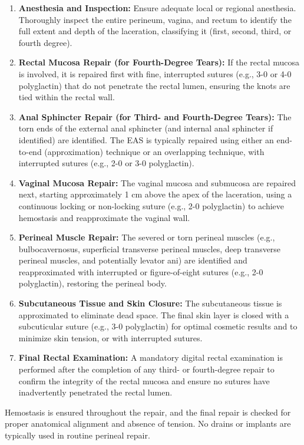 \begin{enumerate}
  \item \textbf{Anesthesia and Inspection:} Ensure adequate local or regional anesthesia. Thoroughly inspect the entire perineum, vagina, and rectum to identify the full extent and depth of the laceration, classifying it (first, second, third, or fourth degree).
  \item \textbf{Rectal Mucosa Repair (for Fourth-Degree Tears):} If the rectal mucosa is involved, it is repaired first with fine, interrupted sutures (e.g., 3-0 or 4-0 polyglactin) that do not penetrate the rectal lumen, ensuring the knots are tied within the rectal wall.
  \item \textbf{Anal Sphincter Repair (for Third- and Fourth-Degree Tears):} The torn ends of the external anal sphincter (and internal anal sphincter if identified) are identified. The EAS is typically repaired using either an end-to-end (approximation) technique or an overlapping technique, with interrupted sutures (e.g., 2-0 or 3-0 polyglactin).
  \item \textbf{Vaginal Mucosa Repair:} The vaginal mucosa and submucosa are repaired next, starting approximately 1 cm above the apex of the laceration, using a continuous locking or non-locking suture (e.g., 2-0 polyglactin) to achieve hemostasis and reapproximate the vaginal wall.
  \item \textbf{Perineal Muscle Repair:} The severed or torn perineal muscles (e.g., bulbocavernosus, superficial transverse perineal muscles, deep transverse perineal muscles, and potentially levator ani) are identified and reapproximated with interrupted or figure-of-eight sutures (e.g., 2-0 polyglactin), restoring the perineal body.
  \item \textbf{Subcutaneous Tissue and Skin Closure:} The subcutaneous tissue is approximated to eliminate dead space. The final skin layer is closed with a subcuticular suture (e.g., 3-0 polyglactin) for optimal cosmetic results and to minimize skin tension, or with interrupted sutures.
  \item \textbf{Final Rectal Examination:} A mandatory digital rectal examination is performed after the completion of any third- or fourth-degree repair to confirm the integrity of the rectal mucosa and ensure no sutures have inadvertently penetrated the rectal lumen.
\end{enumerate}

Hemostasis is ensured throughout the repair, and the final repair is checked for proper anatomical alignment and absence of tension. No drains or implants are typically used in routine perineal repair.

